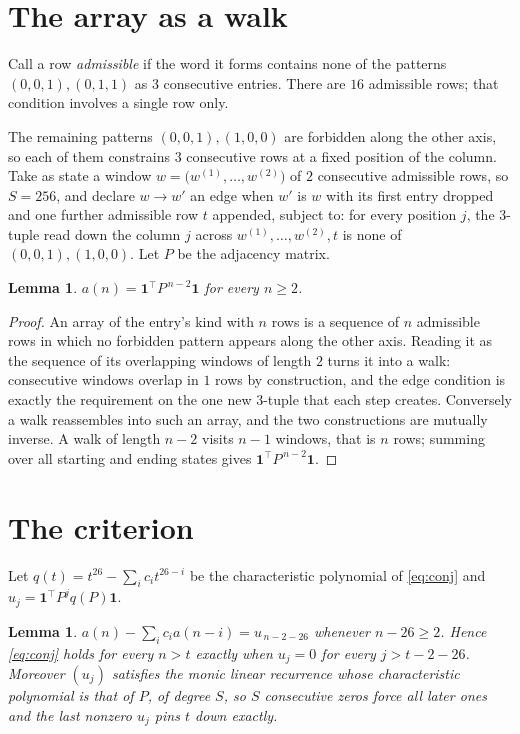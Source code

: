 \documentclass[11pt,a4paper]{article}
\theoremstyle{plain}
\newtheorem{lemma}[theorem]{Lemma}
\theoremstyle{definition}
\begin{document}
\section{The array as a walk}

Call a row \emph{admissible} if the word it forms contains none of the patterns
$(0,0,1), (0,1,1)$ as $3$ consecutive entries. There are $16$ admissible rows; that condition
involves a single row only.

The remaining patterns $(0,0,1), (1,0,0)$ are forbidden along the other axis, so each of them
constrains $3$ consecutive rows at a fixed position of the column. Take as state a
window $w=\bigl(w^{(1)},\dots,w^{(2)}\bigr)$ of $2$ consecutive admissible
rows, so $S=256$, and declare $w\to w'$ an edge when $w'$ is $w$ with its first entry
dropped and one further admissible row $t$ appended, subject to: for every position
$j$, the $3$-tuple read down the column $j$ across $w^{(1)},\dots,w^{(2)},t$
is none of $(0,0,1), (1,0,0)$. Let $P$ be the adjacency matrix.

\begin{lemma}\label{lem:walk}
$a(n)=\mathbf{1}^{\!\top}P^{\,n-2}\mathbf{1}$ for every $n\ge2$.
\end{lemma}

\begin{proof}
An array of the entry's kind with $n$ rows is a sequence of $n$ admissible rows in
which no forbidden pattern appears along the other axis. Reading it as the sequence of its
overlapping windows of length $2$ turns it into a walk: consecutive windows overlap in
$1$ rows by construction, and the edge condition is exactly the requirement on the one
new $3$-tuple that each step creates. Conversely a walk reassembles into such an array,
and the two constructions are mutually inverse. A walk of length $n-2$ visits $n-1$
windows, that is $n$ rows; summing over all starting and ending states gives
$\mathbf{1}^{\!\top}P^{\,n-2}\mathbf{1}$.
\end{proof}

\section{The criterion}

Let $q(t)=t^{26}-\sum_i c_i t^{26-i}$ be the characteristic polynomial of
\eqref{eq:conj} and $u_j=\mathbf{1}^{\!\top}P^{j}q(P)\mathbf{1}$.

\begin{lemma}\label{lem:crit}
$a(n)-\sum_i c_i a(n-i)=u_{\,n-2-26}$ whenever $n-26\ge2$. Hence
\eqref{eq:conj} holds for every $n>t$ exactly when $u_j=0$ for every
$j>t-2-26$. Moreover $(u_j)$ satisfies the monic linear recurrence whose
characteristic polynomial is that of $P$, of degree $S$, so $S$ consecutive zeros force all
later ones and the last nonzero $u_j$ pins $t$ down exactly.
\end{lemma}
\end{document}
